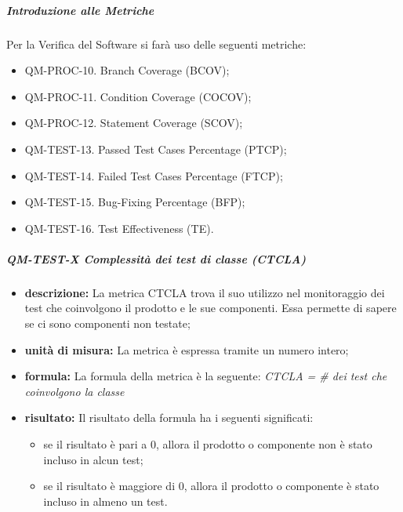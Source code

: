                     \subparagraph{Introduzione alle Metriche}

                         Per la Verifica del Software si farà uso delle seguenti metriche:

                        \begin{itemize}

                            \item QM-PROC-10. Branch Coverage (BCOV);
                            \item QM-PROC-11. Condition Coverage (COCOV);
                            \item QM-PROC-12. Statement Coverage (SCOV);
                            \item QM-TEST-13. Passed Test Cases Percentage (PTCP);
                            \item QM-TEST-14. Failed Test Cases Percentage (FTCP);
                            \item QM-TEST-15. Bug-Fixing Percentage (BFP);
                            \item QM-TEST-16. Test Effectiveness (TE).
                        \end{itemize}

                    \subparagraph{QM-TEST-X Complessità dei test di classe (CTCLA)}

                    \begin{itemize}
                    \item \textbf{descrizione: }
                        La metrica CTCLA trova il suo utilizzo nel monitoraggio dei test che coinvolgono il prodotto e le sue componenti. Essa permette di sapere se ci sono componenti non testate;
                    \item \textbf{unità di misura: }
                        La metrica è espressa tramite un numero intero;
                    \item \textbf{formula: }
                        La formula della metrica è la seguente:
                        \textit{CTCLA = \# dei test che coinvolgono la classe}
                    \item \textbf{risultato: }
                        Il risultato della formula ha i seguenti significati:
                        \begin{itemize}
                            \item se il risultato è pari a 0, allora il prodotto o componente non è stato incluso in alcun test;
                            \item se il risultato è maggiore di 0, allora il prodotto o componente è stato incluso in almeno un test.
                        \end{itemize}
                    \end{itemize}


